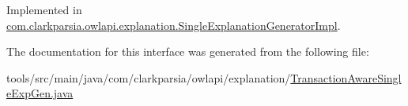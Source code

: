 Implemented in \hyperlink{classcom_1_1clarkparsia_1_1owlapi_1_1explanation_1_1_single_explanation_generator_impl_a710ad794ef4c66a5d39999379e04a2ef}{com.\-clarkparsia.\-owlapi.\-explanation.\-Single\-Explanation\-Generator\-Impl}.



The documentation for this interface was generated from the following file\-:\begin{DoxyCompactItemize}
\item 
tools/src/main/java/com/clarkparsia/owlapi/explanation/\hyperlink{_transaction_aware_single_exp_gen_8java}{Transaction\-Aware\-Single\-Exp\-Gen.\-java}\end{DoxyCompactItemize}
